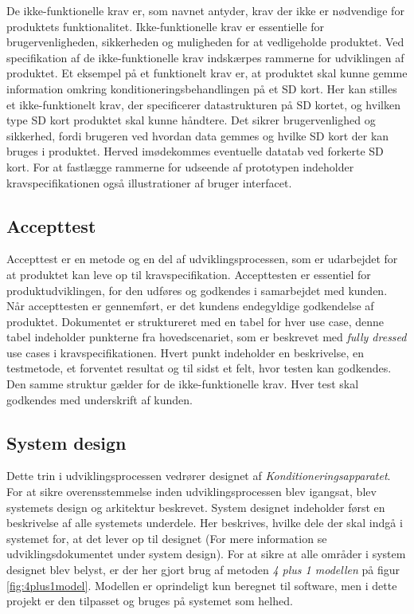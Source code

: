 	De ikke-funktionelle krav er, som navnet antyder, krav der ikke er nødvendige for produktets funktionalitet. Ikke-funktionelle krav er essentielle for brugervenligheden, sikkerheden og muligheden for at vedligeholde produktet. Ved specifikation af de ikke-funktionelle krav indskærpes rammerne for udviklingen af produktet. Et eksempel på et funktionelt krav er, at produktet skal kunne gemme information omkring konditioneringsbehandlingen på et SD kort. Her kan stilles et ikke-funktionelt krav, der specificerer datastrukturen på SD kortet, og hvilken type SD kort produktet skal kunne håndtere. Det sikrer brugervenlighed og sikkerhed, fordi brugeren ved hvordan data gemmes og hvilke SD kort der kan bruges i produktet. Herved imødekommes eventuelle datatab ved forkerte SD kort. For at fastlægge rammerne for udseende af prototypen indeholder kravspecifikationen også illustrationer af bruger interfacet. 
	
	\subsection{Accepttest} \label{title:accepttest}
	Accepttest er en metode og en del af udviklingsprocessen, som er udarbejdet for at produktet kan leve op til kravspecifikation. Accepttesten er essentiel for produktudviklingen, for den udføres og godkendes i samarbejdet med kunden. Når accepttesten er gennemført, er det kundens endegyldige godkendelse af produktet. 
	Dokumentet er struktureret med en tabel for hver use case, denne tabel indeholder punkterne fra hovedscenariet, som er beskrevet med \textit{fully dressed} use cases i kravspecifikationen. Hvert punkt indeholder en beskrivelse, en testmetode, et forventet resultat og til sidst et felt, hvor testen kan godkendes. Den samme struktur gælder for de ikke-funktionelle krav. Hver test skal godkendes med underskrift af kunden.
	
	\subsection{System design} \label{title:systemdesign}
	Dette trin i udviklingsprocessen vedrører designet af \textit{Konditioneringsapparatet}. For at sikre overensstemmelse inden udviklingsprocessen blev igangsat, blev systemets design og arkitektur beskrevet. System designet indeholder først en beskrivelse af alle systemets underdele. Her beskrives, hvilke dele der skal indgå i systemet for, at det lever op til designet (For mere information se udviklingsdokumentet under system design).
	For at sikre at alle områder i system designet blev belyst, er der her gjort brug af metoden \textit{4 plus 1 modellen} på figur \ref{fig:4plus1model}. Modellen er oprindeligt kun beregnet til software, men i dette projekt er den tilpasset og bruges på systemet som helhed. 
	
